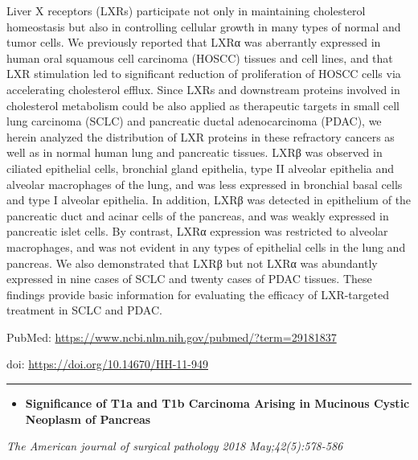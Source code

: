 \documentclass[]{article}
\providecommand{\tightlist}{%
  \setlength{\itemsep}{0pt}\setlength{\parskip}{0pt}}
\begin{document}
Liver X receptors (LXRs) participate not only in maintaining cholesterol
homeostasis but also in controlling cellular growth in many types of
normal and tumor cells. We previously reported that LXRα was aberrantly
expressed in human oral squamous cell carcinoma (HOSCC) tissues and cell
lines, and that LXR stimulation led to significant reduction of
proliferation of HOSCC cells via accelerating cholesterol efflux. Since
LXRs and downstream proteins involved in cholesterol metabolism could be
also applied as therapeutic targets in small cell lung carcinoma (SCLC)
and pancreatic ductal adenocarcinoma (PDAC), we herein analyzed the
distribution of LXR proteins in these refractory cancers as well as in
normal human lung and pancreatic tissues. LXRβ was observed in ciliated
epithelial cells, bronchial gland epithelia, type II alveolar epithelia
and alveolar macrophages of the lung, and was less expressed in
bronchial basal cells and type I alveolar epithelia. In addition, LXRβ
was detected in epithelium of the pancreatic duct and acinar cells of
the pancreas, and was weakly expressed in pancreatic islet cells. By
contrast, LXRα expression was restricted to alveolar macrophages, and
was not evident in any types of epithelial cells in the lung and
pancreas. We also demonstrated that LXRβ but not LXRα was abundantly
expressed in nine cases of SCLC and twenty cases of PDAC tissues. These
findings provide basic information for evaluating the efficacy of
LXR-targeted treatment in SCLC and PDAC.

PubMed: \url{https://www.ncbi.nlm.nih.gov/pubmed/?term=29181837}

doi: \url{https://doi.org/10.14670/HH-11-949}

{}

{}

\begin{center}\rule{0.5\linewidth}{\linethickness}\end{center}

\begin{itemize}
\tightlist
\item
  \textbf{Significance of T1a and T1b Carcinoma Arising in Mucinous
  Cystic Neoplasm of Pancreas}
\end{itemize}

\emph{The American journal of surgical pathology 2018 May;42(5):578-586}
\end{document}
